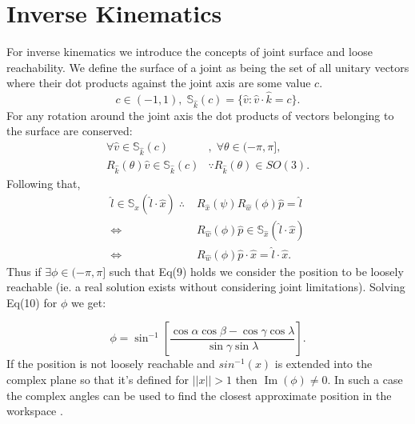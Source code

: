 \documentclass[a4paper,twocolumn,10pt]{article}
\begin{document}
\section*{Inverse Kinematics}
For inverse kinematics we introduce the concepts of joint surface and loose
reachability.
We define the surface of a joint as being the set of all unitary vectors where
their dot products against the joint axis are some value $c$.
\begin{equation} 
    c \in (-1,1),\; \mathbb{S}_{\hat k}(c) = \{ \hat v :
        \hat v \cdot \hat k = c \}.
\end{equation}
For any rotation around the joint axis the dot products of vectors belonging
to the surface are conserved:
\begin{equation}
    \begin{split}
        \forall \hat v \in \mathbb{S}_{\hat k}(c)&,\; 
        \forall \theta \in (-\pi,\pi],\\
        R_{\hat k}(\theta)\hat v \in \mathbb{S}_{\hat k}(c)
        &\because R_{\hat k}(\theta) \in SO(3).
    \end{split}
\end{equation}
Following that,
\begin{align}
        \hat l \in \mathbb{S}_{\hat x} (\hat l \cdot \hat x) \;\therefore\;
        &R_{\hat x} (\psi) R_{\hat w}(\phi) \hat p = \hat l \\
        \iff &R_{\hat w}(\phi) \hat p 
        \in \mathbb{S}_{\hat x}(\hat l \cdot \hat x) \\
        \iff &R_{\hat w} (\phi) \hat p \cdot \hat x = 
        \hat l \cdot \hat x.
\end{align}
Thus if $\exists \phi \in (-\pi,\pi]$ such that Eq(9) holds we consider the
position to be loosely reachable (ie. a real solution exists without
considering joint limitations). Solving Eq(10) for $\phi$ we get:

\begin{equation}
    \phi = \sin^{-1} \left[
        \frac{ \cos\alpha \cos\beta - \cos\gamma \cos\lambda }
        { \sin\gamma \sin\lambda }
    \right].
\end{equation}
If the position is not loosely reachable and $sin^{-1}(x)$ is extended into the
complex plane so that it's defined for $||x||>1$ then $\operatorname{Im}(\phi)
\neq 0$. In such a case the complex angles can be used to find the closest
approximate position in the workspace \cite{pohl1990}.
\end{document}
